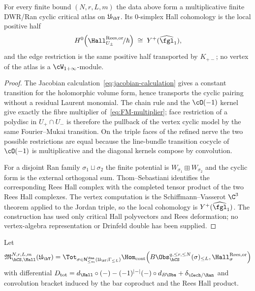 \begin{lemma}
\label{lem:conifold-cech-ran-cyclic-atlas}
For every finite bound $(N,r,L,m)$ the data above form a multiplicative
finite DWR/Ran cyclic critical atlas on $\mathfrak U_{\bY}$. Its
$0$-simplex Hall cohomology is the local positive half
\[
 H^0\!\left(\Hall^{\mathrm{Rees},\mathrm{or}}_{U_\pm}\!/\hbar\right)
 \;\cong\;
 Y^+(\widehat{\fgl}_1),
\]
and the edge restriction is the same positive half transported by
$K_{+-}$; no vertex of the atlas is a $\cW_{1+\infty}$-module.
\end{lemma}

\begin{proof}
The Jacobian calculation~\eqref{eq:jacobian-calculation} gives a
constant transition for the holomorphic volume form, hence transports
the cyclic pairing without a residual Laurent monomial. The chain rule
and the $\cO(-1)$ kernel give exactly the fibre multiplier
of~\eqref{eq:FM-multiplier}; face restriction of a polydisc in
$U_+\cap U_-$ is therefore the pullback of the vertex cyclic model by
the same Fourier--Mukai transition. On the triple faces of the refined
nerve the two possible restrictions are equal because the line-bundle
transition cocycle of $\cO(-1)$ is multiplicative and the diagonal
kernels compose by convolution.

For a disjoint Ran family
$\sigma_1\sqcup\sigma_2$ the finite potential is
$W_{\sigma_1}\boxplus W_{\sigma_2}$ and the cyclic form is the external
orthogonal sum. Thom--Sebastiani identifies the corresponding Rees Hall
complex with the completed tensor product of the two Rees Hall
complexes. The vertex computation is the Schiffmann--Vasserot
$\C^3$ theorem applied to the Jordan triple, so the local cohomology is
$Y^+(\widehat{\fgl}_1)$. The construction has used only critical Hall
polyvectors and Rees deformation; no vertex-algebra representation or
Drinfeld double has been supplied.
\end{proof}

Let
\[
 \mathfrak M_{\hCS,\Hall}^{N,r,L,m}(\mathfrak U_{\bY})
 =
 \Tot_{\sigma\in\mathsf N^{\Ran}_{\le m}(\mathfrak U_{\bY};
 \Gamma_{\le L})}
 \Hom_{\mathrm{cont}}\!\left(
 B\Obs_{\hCS}^{q,\le r,\le N}(\sigma)_{\le L},
 \Hall_{\sigma}^{\mathrm{Rees},\mathrm{or}}
 \right)
\]
with differential $D_{\mathrm{tot}}=d_{\Hall}\circ(-)
-(-1)^{|-|}(-)\circ d_{B\Obs}+\delta_{\Cech/\Ran}$ and convolution
bracket induced by the bar coproduct and the Rees Hall product.

